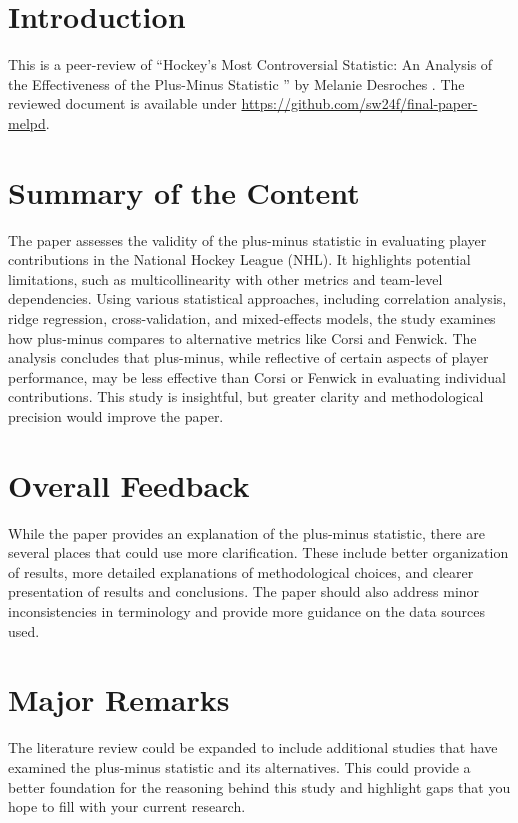 \documentclass[a4paper,9pt]{scrartcl}
\title{\titletext}
\author{Lucy Liu}
\begin{document}
\maketitle
\section{Introduction}
This is a peer-review of \enquote{Hockey’s Most Controversial Statistic: An Analysis of the Effectiveness of the Plus-Minus Statistic } by Melanie Desroches . The reviewed document
is available under \href{https://github.com/sw24f/final-paper-melpd}{https://github.com/sw24f/final-paper-melpd}.

\section{Summary of the Content}
The paper assesses the validity of the plus-minus statistic in evaluating player contributions in the National Hockey League (NHL). It highlights potential limitations, such as multicollinearity with other metrics and team-level dependencies. Using various statistical approaches, including correlation analysis, ridge regression, cross-validation, and mixed-effects models, the study examines how plus-minus compares to alternative metrics like Corsi and Fenwick. The analysis concludes that plus-minus, while reflective of certain aspects of player performance, may be less effective than Corsi or Fenwick in evaluating individual contributions. This study is insightful, but greater clarity and methodological precision would improve the paper. 


\section{Overall Feedback}
While the paper provides an explanation of the plus-minus statistic, there are several places that could use more clarification. These include better organization of results, more detailed explanations of methodological choices, and clearer presentation of results and conclusions. The paper should also address minor inconsistencies in terminology and provide more guidance on the data sources used. 

\section{Major Remarks}
The literature review could be expanded to include additional studies that have examined the plus-minus statistic and its alternatives. This could provide a better foundation for the reasoning behind this study and highlight gaps that you hope to fill with your current research.
\end{document}
